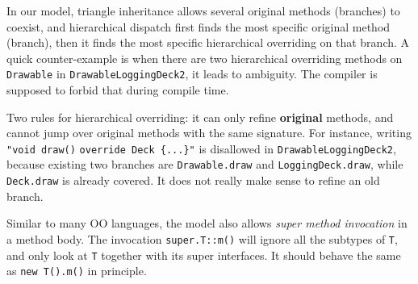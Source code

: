 In our model, triangle inheritance allows several original methods (branches) to coexist, and hierarchical dispatch first finds the most specific original method (branch), then it finds the most specific hierarchical overriding on that branch. A quick counter-example is when there are two hierarchical overriding methods on \lstinline|Drawable| in \lstinline|DrawableLoggingDeck2|, it leads to ambiguity. The compiler is supposed to forbid that during compile time.

Two rules for hierarchical overriding: it can only refine \textbf{original} methods, and cannot jump over original methods with the same signature. For instance, writing \lstinline|"void draw()| \lstinline|override Deck {...}"| is disallowed in \lstinline|DrawableLoggingDeck2|, because existing two branches are \lstinline|Drawable.draw| and \lstinline|LoggingDeck.draw|, while \lstinline|Deck.draw| is already covered. It does not really make sense to refine an old branch.

Similar to many OO languages, the model also allows \textit{super method invocation} in a method body. The invocation \lstinline|super.T::m()| will ignore all the subtypes of \lstinline|T|, and only look at \lstinline|T| together with its super interfaces. It should behave the same as \lstinline|new T().m()| in principle.